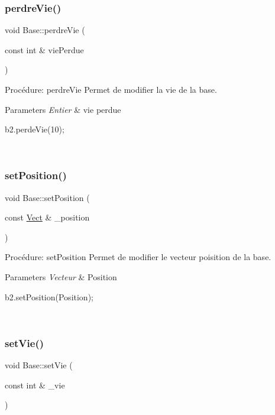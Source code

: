 \subsubsection{\texorpdfstring{perdre\+Vie()}{perdreVie()}}
{\footnotesize\ttfamily void Base\+::perdre\+Vie (\begin{DoxyParamCaption}\item[{const int \&}]{vie\+Perdue }\end{DoxyParamCaption})}



Procédure\+: perdre\+Vie Permet de modifier la vie de la base. 


\begin{DoxyParams}{Parameters}
{\em Entier} & vie perdue 
\begin{DoxyCode}
b2.perdeVie(10);
\end{DoxyCode}
 \\
\hline
\end{DoxyParams}
\mbox{\label{classBase_afe9eb29bdaf866dc20af0b833209e29e}} 
\subsubsection{\texorpdfstring{set\+Position()}{setPosition()}}
{\footnotesize\ttfamily void Base\+::set\+Position (\begin{DoxyParamCaption}\item[{const \hyperlink{classVect}{Vect} \&}]{\+\_\+position }\end{DoxyParamCaption})}



Procédure\+: set\+Position Permet de modifier le vecteur poisition de la base. 


\begin{DoxyParams}{Parameters}
{\em Vecteur} & Position 
\begin{DoxyCode}
b2.setPosition(Position);
\end{DoxyCode}
 \\
\hline
\end{DoxyParams}
\mbox{\label{classBase_a92e0991ffd34efb2f2d6db3f3bd4093d}} 
\subsubsection{\texorpdfstring{set\+Vie()}{setVie()}}
{\footnotesize\ttfamily void Base\+::set\+Vie (\begin{DoxyParamCaption}\item[{const int \&}]{\+\_\+vie }\end{DoxyParamCaption})}



